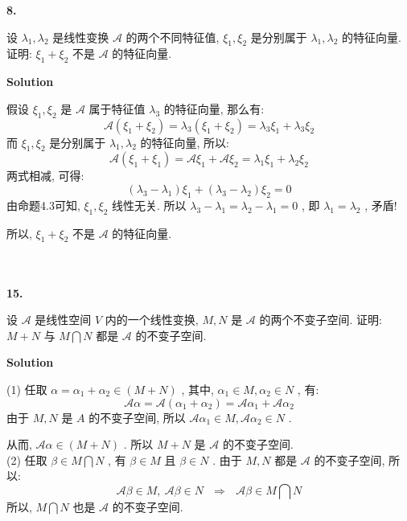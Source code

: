 \documentclass[11pt,a4paper,openany,oneside]{book}
\newcommand\Solution{\noindent\textbf{\textsf{Solution}}\par\medskip}
\begin{document}
\begin{myexample}
	\textbf{8.} 

设 $ \lambda_1, \lambda_2 $ 是线性变换 $ \mathcal{A} $ 的两个不同特征值,  $ \xi_1, \xi_2 $ 是分别属于 $ \lambda_1, \lambda_2 $ 的特征向量. 证明:  $ \xi_1 + \xi_2 $ 不是 $ \mathcal{A} $ 的特征向量. \\

\end{myexample}
\Solution

假设 $ \xi_1, \xi_2 $ 是 $ \mathcal{A} $ 属于特征值 $ \lambda_3 $ 的特征向量, 那么有:
 $$  \mathcal{A}(\xi_1 + \xi_2) = \lambda_3(\xi_1 + \xi_2) = \lambda_3 \xi_1 + \lambda_3 \xi_2  $$ 
而 $ \xi_1, \xi_2 $ 是分别属于 $ \lambda_1, \lambda_2 $ 的特征向量, 所以:
 $$  \mathcal{A}(\xi_1 + \xi_1) = \mathcal{A}\xi_1 + \mathcal{A}\xi_2 = \lambda_1\xi_1 + \lambda_2 \xi_2  $$ 
两式相减, 可得:
 $$  (\lambda_3 - \lambda_1)\xi_1 + (\lambda_3 - \lambda_2)\xi_2 = 0  $$ 
由命题4.3可知,  $ \xi_1, \xi_2 $ 线性无关. 所以 $ \lambda_3 - \lambda_1 = \lambda_2 - \lambda_1 = 0 $ , 即 $ \lambda_1 = \lambda_2 $ , 矛盾!

所以,   $ \xi_1 + \xi_2 $ 不是 $ \mathcal{A} $ 的特征向量.  \\  \\  \\


\begin{myexample}
	\textbf{15.}

设 $ \mathcal{A} $ 是线性空间 $ V $ 内的一个线性变换,  $ M,N $ 是 $ \mathcal{A} $ 的两个不变子空间. 证明: $ M+N $ 与 $ M \bigcap N $ 都是 $ \mathcal{A} $ 的不变子空间.  \\

\end{myexample}
\Solution  

(1) 任取 $ \alpha = \alpha_1 + \alpha_2 \in (M + N) $ , 其中,  $ \alpha_1 \in M, \alpha_2 \in N $ , 有:
 $$ \mathcal{A}\alpha = \mathcal{A}(\alpha_1 + \alpha_2) = \mathcal{A}\alpha_1 + \mathcal{A}\alpha_2 $$ 
由于 $ M, N $ 是 $ A $ 的不变子空间, 所以 $ \mathcal{A}\alpha_1 \in M , \mathcal{A}\alpha_2 \in N $ .

从而,  $ \mathcal{A}\alpha \in (M+N) $ . 所以 $ M+N $ 是 $ \mathcal{A} $ 的不变子空间. \\

(2) 任取 $ \beta \in M \bigcap N $ , 有 $ \beta \in M $ 且 $ \beta \in N $ . 由于 $ M, N $ 都是 $ \mathcal{A} $ 的不变子空间, 所以:
 $$  \mathcal{A}\beta \in M, \  \mathcal{A}\beta \in N \ \ \ \Rightarrow \ \ \ \mathcal{A}\beta \in M \bigcap N  $$ 
所以,  $ M \bigcap N $ 也是 $ \mathcal{A} $ 的不变子空间.  \\  \\  \\ 
\end{document}
